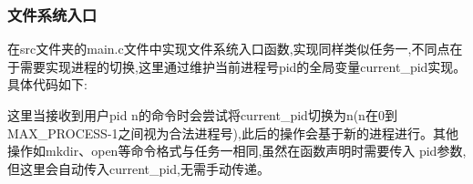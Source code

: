 \subsubsection{文件系统入口}
在src文件夹的main.c文件中实现文件系统入口函数,实现同样类似任务一,不同点在于需要实现进程的切换,这里通过维护当前进程号pid的全局变量current\_pid实现。
具体代码如下:
这里当接收到用户pid n的命令时会尝试将current\_pid切换为n(n在0到MAX\_PROCESS-1之间视为合法进程号),此后的操作会基于新的进程进行。其他操作如mkdir、open等命令格式与任务一相同,虽然在函数声明时需要传入
pid参数,但这里会自动传入current\_pid,无需手动传递。